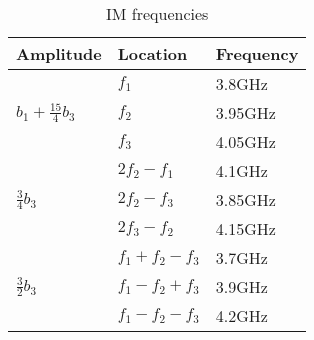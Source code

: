 \documentclass[titlepage]{article}
\begin{document}
\begin{center}
    \begin{table}[ht]
        \centering
        \begin{tabular}{|l|l|l|}
            \hline
            Amplitude                              & Location      & Frequency \\
            \hline
            \multirow{3}{*}{$b_1+\frac{15}{4}b_3$} & $f_1$         & 3.8GHz    \\\cline{2-3}
                                                   & $f_2$         & 3.95GHz   \\\cline{2-3}
                                                   & $f_3$         & 4.05GHz   \\
            \hline
            \multirow{3}{*}{$\frac 34 b_3$ }       & $2f_2-f_1$    & 4.1GHz    \\\cline{2-3}
                                                   & $2f_2-f_3$    & 3.85GHz   \\\cline{2-3}
                                                   & $2f_3-f_2$    & 4.15GHz   \\
            \hline
            \multirow{3}{*}{$\frac 32 b_3$ }       & $f_1+f_2-f_3$ & 3.7GHz    \\\cline{2-3}
                                                   & $f_1-f_2+f_3$ & 3.9GHz    \\\cline{2-3}
                                                   & $f_1-f_2-f_3$ & 4.2GHz    \\
            \hline
        \end{tabular}
        \caption{IM frequencies}
    \end{table}
\end{center}
\end{document}
